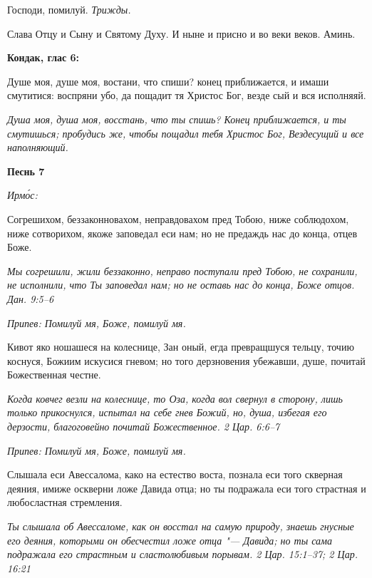 Господи, помилуй. \itshape Трижды.\normalfont{}


Слава Отцу и Сыну и Святому Духу. И ныне и присно и во веки веков. Аминь.





\bfseries Кондак, глас 6:\normalfont{}


Душе моя, душе моя, востани, что спиши? конец приближается, и имаши смутитися: воспряни убо, да пощадит тя Христос Бог, везде сый и вся исполняяй.


\itshape Душа моя, душа моя, восстань, что ты спишь? Конец приближается, и ты смутишься; пробудись же, чтобы пощадил тебя Христос Бог, Вездесущий и все наполняющий.\normalfont{}





\bfseries Песнь 7\normalfont{}


\itshape Ирмо́с:\normalfont{}


Согрешихом, беззаконновахом, неправдовахом пред Тобою, ниже соблюдохом, ниже сотворихом, якоже заповедал еси нам; но не предаждь нас до конца, отцев Боже.


\itshape Мы согрешили, жили беззаконно, неправо поступали пред Тобою, не сохранили, не исполнили, что Ты заповедал нам; но не оставь нас до конца, Боже отцов. Дан. 9:5–6\normalfont{}


\itshape Припев:\normalfont{} Помилуй мя, Боже, помилуй мя.


Кивот яко ношашеся на колеснице, Зан оный, егда превращшуся тельцу, точию коснуся, Божиим искусися гневом; но того дерзновения убежавши, душе, почитай Божественная честне.


\itshape Когда ковчег везли на колеснице, то Оза, когда вол свернул в сторону, лишь только прикоснулся, испытал на себе гнев Божий, но, душа, избегая его дерзости, благоговейно почитай Божественное. 2 Цар. 6:6–7\normalfont{}


\itshape Припев:\normalfont{} Помилуй мя, Боже, помилуй мя.


Слышала еси Авессалома, како на естество воста, познала еси того скверная деяния, имиже оскверни ложе Давида отца; но ты подражала еси того страстная и любосластная стремления.


\itshape Ты слышала об Авессаломе, как он восстал на самую природу, знаешь гнусные его деяния, которыми он обесчестил ложе отца "--- Давида; но ты сама подражала его страстным и сластолюбивым порывам. 2 Цар. 15:1–37; 2 Цар. 16:21\normalfont{}


